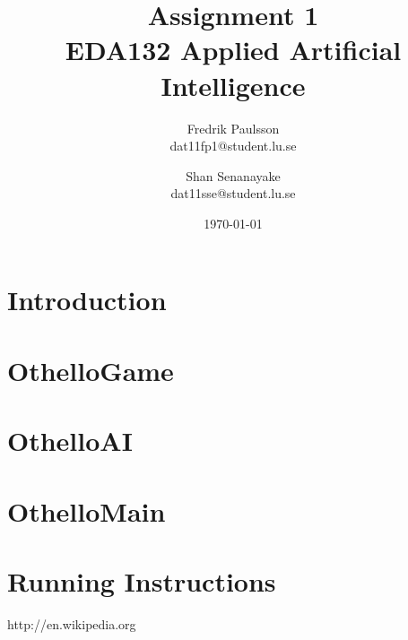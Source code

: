 \documentclass[a4paper]{article}
\title{Assignment 1 \\ EDA132 Applied Artificial Intelligence}
\date{\today}
\author{Fredrik Paulsson \\ dat11fp1@student.lu.se \and Shan Senanayake \\ dat11sse@student.lu.se}
\begin{document}
\maketitle


\section{Introduction}

\section{OthelloGame}

\section{OthelloAI}

\section{OthelloMain}

\section{Running Instructions}


\begin{thebibliography}{1}
http://en.wikipedia.org
\end{thebibliography}
\end{document}
